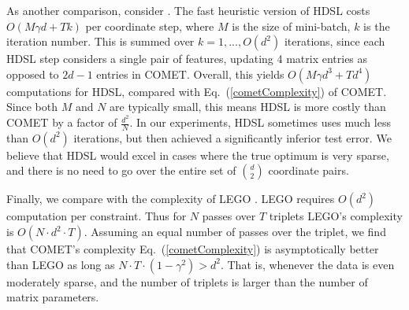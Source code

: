 \documentclass[twoside,11pt]{article}
\renewcommand{\eqref}[1]{Eq.~(\ref{#1})}
\begin{document}

As another comparison, consider \citet{HDSL}. The fast heuristic version of HDSL costs $O(M\gamma d+Tk)$ per coordinate step, where $M$ is the size of mini-batch, $k$ is the iteration number. This is summed over $k=1,...,O(d^2)$ iterations, since each HDSL step considers a single pair of features, updating 4 matrix entries as opposed to $2d-1$ entries in COMET. Overall, this yields $O(M\gamma d^3+Td^4)$ computations for HDSL, compared with \eqref{cometComplexity} of COMET. Since both $M$ and $N$ are typically small, this means HDSL is more costly than COMET by a factor of $\frac{d^2}{N}$. In our experiments, HDSL sometimes uses much less than $O(d^2)$ iterations, but then achieved a significantly inferior test error. We believe that HDSL would excel in cases where the true optimum is very sparse, and there is no need to go over the entire set of $d \choose 2$ coordinate pairs.

Finally, we compare with the complexity of LEGO \citep{lego}. LEGO requires $O(d^2)$ computation per constraint. Thus for $N$ passes over $T$ triplets LEGO's complexity is $O(N\cdot d^2 \cdot T)$. Assuming an equal number of passes over the triplet, we find that COMET's complexity \eqref{cometComplexity} is asymptotically better than LEGO as long as $N \cdot T \cdot (1-\gamma^2) > d^2$. That is, whenever the data is even moderately sparse, and the number of triplets is larger than the number of matrix parameters.
\end{document}
